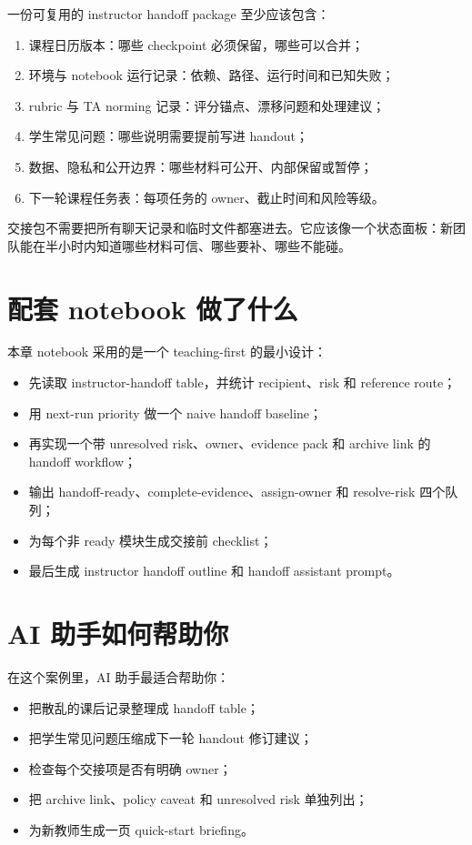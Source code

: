 一份可复用的 instructor handoff package 至少应该包含：

\begin{enumerate}
    \item 课程日历版本：哪些 checkpoint 必须保留，哪些可以合并；
    \item 环境与 notebook 运行记录：依赖、路径、运行时间和已知失败；
    \item rubric 与 TA norming 记录：评分锚点、漂移问题和处理建议；
    \item 学生常见问题：哪些说明需要提前写进 handout；
    \item 数据、隐私和公开边界：哪些材料可公开、内部保留或暂停；
    \item 下一轮课程任务表：每项任务的 owner、截止时间和风险等级。
\end{enumerate}

交接包不需要把所有聊天记录和临时文件都塞进去。它应该像一个状态面板：新团队能在半小时内知道哪些材料可信、哪些要补、哪些不能碰。

\section{配套 notebook 做了什么}

本章 notebook 采用的是一个 teaching-first 的最小设计：

\begin{itemize}
    \item 先读取 instructor-handoff table，并统计 recipient、risk 和 reference route；
    \item 用 next-run priority 做一个 naive handoff baseline；
    \item 再实现一个带 unresolved risk、owner、evidence pack 和 archive link 的 handoff workflow；
    \item 输出 handoff-ready、complete-evidence、assign-owner 和 resolve-risk 四个队列；
    \item 为每个非 ready 模块生成交接前 checklist；
    \item 最后生成 instructor handoff outline 和 handoff assistant prompt。
\end{itemize}

\section{AI 助手如何帮助你}

在这个案例里，AI 助手最适合帮助你：

\begin{itemize}
    \item 把散乱的课后记录整理成 handoff table；
    \item 把学生常见问题压缩成下一轮 handout 修订建议；
    \item 检查每个交接项是否有明确 owner；
    \item 把 archive link、policy caveat 和 unresolved risk 单独列出；
    \item 为新教师生成一页 quick-start briefing。
\end{itemize}

